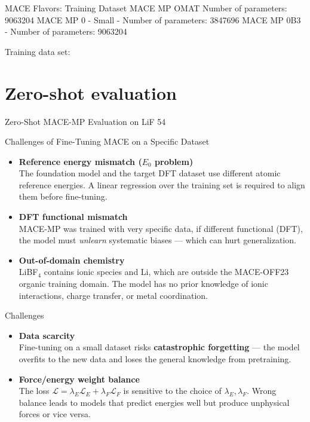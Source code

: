 \documentclass[aspectratio=169]{beamer}
\begin{document}
\begin{frame}{MACE Flavors: Training Dataset}
MACE MP OMAT Number of parameters: 9063204
MACE MP 0 - Small - Number of parameters: 3847696
MACE MP 0B3 - Number of parameters: 9063204

Training data set:


\end{frame}

\section{Zero-shot evaluation}
\begin{frame}{Zero-Shot MACE-MP Evaluation on LiF 54}

\end{frame}


\begin{frame}{Challenges of Fine-Tuning MACE on a Specific Dataset}

  \begin{itemize}

    \item \textbf{Reference energy mismatch ($E_0$ problem)}\\
      The foundation model and the target DFT dataset use different
      atomic reference energies. A linear regression over the
      training set is required to align them before fine-tuning.

    \medskip
    \item \textbf{DFT functional mismatch}\\
      MACE-MP was trained with very specific data, if different
      functional (DFT), the model must \emph{unlearn} systematic
      biases --- which can hurt generalization.
    \medskip
    \item \textbf{Out-of-domain chemistry}\\
      LiBF$_4$ contains ionic species and Li, which are outside
      the MACE-OFF23 organic training domain. The model has no
      prior knowledge of ionic interactions, charge transfer,
      or metal coordination.
\end{itemize}
\end{frame}
\begin{frame}{Challenges}
    \begin{itemize}
    \item \textbf{Data scarcity}\\
      Fine-tuning on a small dataset risks \textbf{catastrophic
      forgetting} --- the model overfits to the new data and
      loses the general knowledge from pretraining.

    \item \textbf{Force/energy weight balance}\\
      The loss $\mathcal{L} = \lambda_E \mathcal{L}_E +
      \lambda_F \mathcal{L}_F$ is sensitive to the choice of
      $\lambda_E, \lambda_F$. Wrong balance leads to models
      that predict energies well but produce unphysical forces
      or vice versa.

  \end{itemize}


\end{frame}
\end{document}
